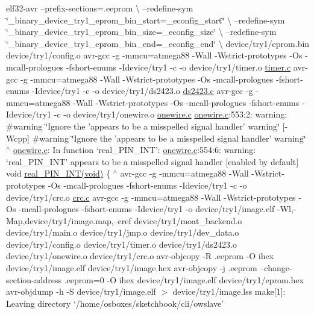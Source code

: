 elf32-\/avr --prefix-\/sections=.eeprom \textbackslash{} --redefine-\/sym \char`\"{}\-\_\-binary\-\_\-device\-\_\-try1\-\_\-eprom\-\_\-bin\-\_\-start=\-\_\-econfig\-\_\-start\char`\"{} \textbackslash{} --redefine-\/sym \char`\"{}\-\_\-binary\-\_\-device\-\_\-try1\-\_\-eprom\-\_\-bin\-\_\-size=\-\_\-econfig\-\_\-size\char`\"{} \textbackslash{} --redefine-\/sym \char`\"{}\-\_\-binary\-\_\-device\-\_\-try1\-\_\-eprom\-\_\-bin\-\_\-end=\-\_\-econfig\-\_\-end\char`\"{} \textbackslash{} device/try1/eprom.\-bin device/try1/config.\-o avr-\/gcc -\/g -\/mmcu=atmega88 -\/\-Wall -\/\-Wstrict-\/prototypes -\/\-Os -\/mcall-\/prologues -\/fshort-\/enums -\/\-Idevice/try1 -\/c -\/o device/try1/timer.\-o \hyperlink{timer_8c}{timer.\-c} avr-\/gcc -\/g -\/mmcu=atmega88 -\/\-Wall -\/\-Wstrict-\/prototypes -\/\-Os -\/mcall-\/prologues -\/fshort-\/enums -\/\-Idevice/try1 -\/c -\/o device/try1/ds2423.\-o \hyperlink{ds2423_8c}{ds2423.\-c} avr-\/gcc -\/g -\/mmcu=atmega88 -\/\-Wall -\/\-Wstrict-\/prototypes -\/\-Os -\/mcall-\/prologues -\/fshort-\/enums -\/\-Idevice/try1 -\/c -\/o device/try1/onewire.\-o \hyperlink{onewire_8c}{onewire.\-c} \hyperlink{onewire_8c}{onewire.\-c}\-:553\-:2\-: warning\-: \#warning \char`\"{}\-Ignore the 'appears to be a misspelled signal handler' warning\char`\"{} \mbox{[}-\/\-Wcpp\mbox{]} \#warning \char`\"{}\-Ignore the 'appears to be a misspelled signal handler' warning\char`\"{} $^\wedge$ \hyperlink{onewire_8c}{onewire.\-c}\-: In function ‘real\-\_\-\-P\-I\-N\-\_\-\-I\-N\-T’\-: \hyperlink{onewire_8c}{onewire.\-c}\-:554\-:6\-: warning\-: ‘real\-\_\-\-P\-I\-N\-\_\-\-I\-N\-T’ appears to be a misspelled signal handler \mbox{[}enabled by default\mbox{]} void \hyperlink{onewire_8c_ad685ebd23c8e96348e9924394dc696a8}{real\-\_\-\-P\-I\-N\-\_\-\-I\-N\-T(void)} \{ $^\wedge$ avr-\/gcc -\/g -\/mmcu=atmega88 -\/\-Wall -\/\-Wstrict-\/prototypes -\/\-Os -\/mcall-\/prologues -\/fshort-\/enums -\/\-Idevice/try1 -\/c -\/o device/try1/crc.\-o \hyperlink{crc_8c}{crc.\-c} avr-\/gcc -\/g -\/mmcu=atmega88 -\/\-Wall -\/\-Wstrict-\/prototypes -\/\-Os -\/mcall-\/prologues -\/fshort-\/enums -\/\-Idevice/try1 -\/o device/try1/image.\-elf -\/\-Wl,-\/\-Map,device/try1/image.\-map,--cref device/try1/moat\-\_\-backend.\-o device/try1/main.\-o device/try1/jmp.\-o device/try1/dev\-\_\-data.\-o device/try1/config.\-o device/try1/timer.\-o device/try1/ds2423.\-o device/try1/onewire.\-o device/try1/crc.\-o avr-\/objcopy -\/\-R .eeprom -\/\-O ihex device/try1/image.\-elf device/try1/image.\-hex avr-\/objcopy -\/j .eeprom --change-\/section-\/address .eeprom=0 -\/\-O ihex device/try1/image.\-elf device/try1/eprom.\-hex avr-\/objdump -\/h -\/\-S device/try1/image.\-elf $>$ device/try1/image.\-lss make\mbox{[}1\mbox{]}\-: Leaving directory `/home/osboxes/sketchbook/cli/owslave'


